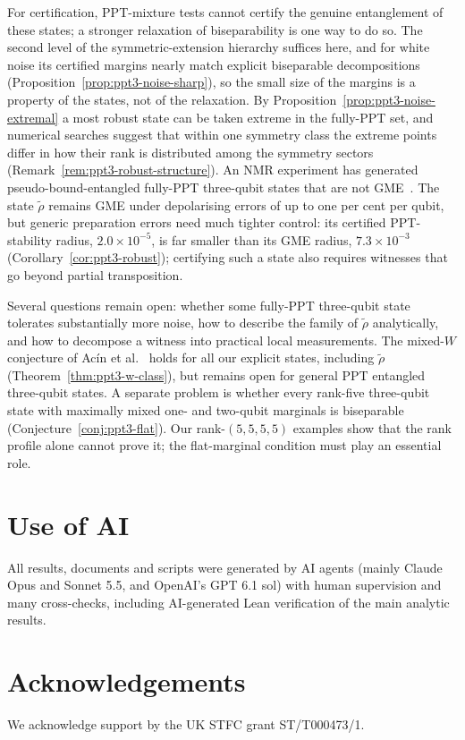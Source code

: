 \documentclass[11pt]{article}
\theoremstyle{remark}
\begin{document}
For certification, PPT-mixture tests cannot certify the genuine entanglement of these states; a stronger relaxation of
biseparability is one way to do so. The second level of the
symmetric-extension hierarchy suffices here, and for white noise its certified margins nearly match explicit biseparable
decompositions (Proposition~\ref{prop:ppt3-noise-sharp}), so the small size of the margins is a property of the states,
not of the relaxation. By
Proposition~\ref{prop:ppt3-noise-extremal} a most robust state can be taken extreme in the fully-PPT set, and numerical searches
suggest that within one symmetry class the extreme points differ in how their rank is distributed among the symmetry
sectors (Remark~\ref{rem:ppt3-robust-structure}). An NMR experiment has generated pseudo-bound-entangled fully-PPT three-qubit
states that are not GME~\cite{KPBS}. The state $\tilde\rho$ remains GME under depolarising errors of up to one per cent
per qubit, but generic preparation errors need much tighter control: its certified PPT-stability radius, $2.0\times10^{-5}$, is far
smaller than its GME radius, $7.3\times10^{-3}$ (Corollary~\ref{cor:ppt3-robust}); certifying such a state also requires witnesses that go beyond
partial transposition.

Several questions remain open: whether some fully-PPT three-qubit state tolerates substantially more noise, how to
describe the family of $\tilde\rho$ analytically, and how to decompose a witness into practical local measurements. The mixed-$W$ conjecture of
Ac\'in et al.~\cite{ABLS} holds for all our explicit states, including $\tilde\rho$ (Theorem~\ref{thm:ppt3-w-class}), but
remains open for general PPT entangled three-qubit states. A separate problem is whether every rank-five three-qubit state with maximally mixed one- and
two-qubit marginals is biseparable (Conjecture~\ref{conj:ppt3-flat}). Our rank-$(5,5,5,5)$ examples show that
the rank profile alone cannot prove it; the flat-marginal condition must play an essential role.

\section*{Use of AI}
All results, documents and scripts were generated by AI agents (mainly Claude Opus and Sonnet 5.5, and OpenAI's GPT 6.1 sol)
with human supervision and many cross-checks, including AI-generated Lean verification of the main analytic results.

\section*{Acknowledgements}
We acknowledge support by the UK STFC grant ST/T000473/1.
\end{document}
